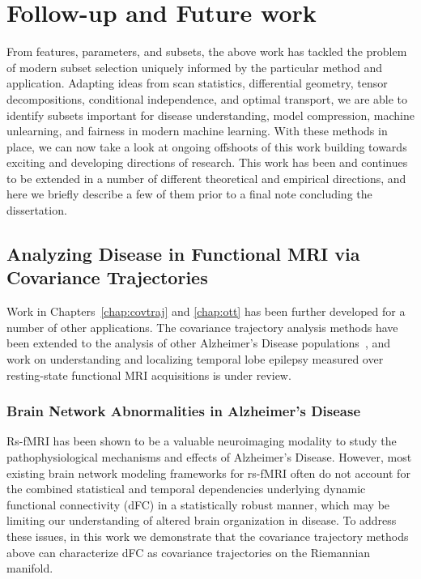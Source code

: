 \chapter{Follow-up and Future work}\label{chap:discuss}

From features, parameters, and subsets, the above work has tackled the problem of modern subset selection uniquely informed by the particular method and application. 
Adapting ideas from 
scan statistics,
differential geometry,
tensor decompositions,
conditional independence,
and optimal transport,
we are able
to identify subsets important
for disease understanding,
model compression,
machine unlearning,
and fairness in modern machine learning.
With these methods in place,
we can now take a look at ongoing offshoots of this work building towards exciting and developing directions of research.
This work has been
and continues to be extended in a number of different theoretical and empirical directions,
and here we briefly describe a few of them prior to a final note concluding the dissertation.


\section{Analyzing Disease in Functional MRI via Covariance Trajectories}

Work in Chapters~\ref{chap:covtraj} and \ref{chap:ott} has been further developed for a number of other applications.
The covariance trajectory analysis
methods have been extended 
to the analysis of other Alzheimer's Disease populations~\citep{isbi},
and work on understanding and localizing temporal lobe epilepsy
measured over resting-state functional MRI acquisitions is under review.

\subsection{Brain Network Abnormalities in Alzheimer's Disease}
Rs-fMRI has been shown to be a valuable neuroimaging modality to study the pathophysiological mechanisms and effects of Alzheimer's Disease. 
However, most existing brain network modeling frameworks for rs-fMRI often do not account for the combined statistical and temporal dependencies underlying dynamic functional connectivity (dFC) in a statistically robust manner, 
which may be limiting our understanding of altered brain organization in disease.
To address these issues, in this work we demonstrate that
the covariance trajectory methods above can characterize dFC as covariance trajectories on the Riemannian manifold.

